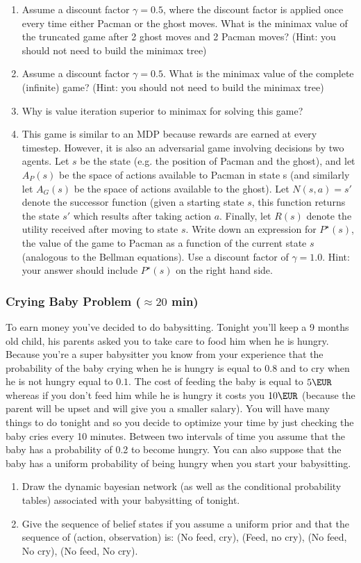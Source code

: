\documentclass[a4paper, 10pt]{article}
\begin{document}
\begin{enumerate}
    \item Assume a discount factor $\gamma = 0.5$, where the discount factor is applied once every time either Pacman or
the ghost moves. What is the minimax value of the truncated game after 2 ghost moves and 2 Pacman
moves? (Hint: you should not need to build the minimax tree)
\item Assume a discount factor $\gamma = 0.5$. What is the minimax value of the complete (infinite) game? (Hint:
you should not need to build the minimax tree)
\item Why is value iteration superior to minimax for solving this game? 
\item This game is similar to an MDP because rewards are earned at every timestep. However, it is also an
adversarial game involving decisions by two agents.
Let $s$ be the state (e.g. the position of Pacman and the ghost), and let $A_P (s)$ be the space of actions available to Pacman in state s (and similarly let $A_G(s)$ be the space of actions available to the ghost).
Let $N(s, a) = s'$ denote the successor function (given a starting state $s$, this function returns the state $s'$ which results after taking action $a$. Finally, let $R(s)$ denote the utility received after moving to state $s$.
Write down an expression for $P^\star (s)$, the value of the game to Pacman as a function of the current state $s$ (analogous to the Bellman equations). Use a discount factor of $\gamma = 1.0$. Hint: your answer should include $P^\star (s)$ on the right hand side.
\end{enumerate}
\subsubsection{Crying Baby Problem ($\approx 20$ min)}
To earn money you've decided to do babysitting. Tonight you'll keep a 9 months old child, his parents asked you to take care to food him when he is hungry. Because you're a super babysitter you know from your experience that the probability of the baby crying when he is hungry is equal to $0.8$ and to cry when he is not hungry equal to $0.1$. The cost of feeding the baby is equal to $5\EUR$ whereas if you don't feed him while he is hungry it costs you $10\EUR$ (because the parent will be upset and will give you a smaller salary). You will have many things to do tonight and so you decide to optimize your time by just checking the baby cries every 10 minutes. Between two intervals of time you assume that the baby has a probability of 0.2 to become hungry. You can also suppose that the baby has a uniform probability of being hungry when you start your babysitting.
\begin{enumerate}
    \item Draw the dynamic bayesian network (as well as the conditional probability tables) associated with your babysitting of tonight. 
    \item Give the sequence of belief states if you assume a uniform prior and that the sequence of (action, observation) is: (No feed, cry), (Feed, no cry), (No feed, No cry), (No feed, No cry).
\end{enumerate}
\end{document}
